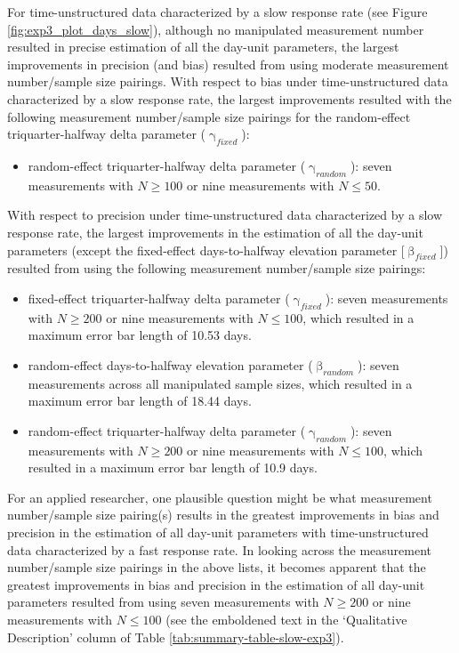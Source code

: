 \documentclass[
12pt, %
twoside,
english]{guelphthesis}
\begin{document}
For time-unstructured data characterized by a slow response rate (see Figure \ref{fig:exp3_plot_days_slow}), although no manipulated measurement number resulted in precise estimation of all the day-unit parameters, the largest improvements in precision (and bias) resulted from using moderate measurement number/sample size pairings. With respect to bias under time-unstructured data characterized by a slow response rate, the largest improvements resulted with the following measurement number/sample size pairings for the random-effect triquarter-halfway delta parameter (\(\upgamma_{fixed}\)):
\begin{itemize}
\tightlist
\item
  random-effect triquarter-halfway delta parameter (\(\upgamma_{random}\)): seven measurements with \(N \ge 100\) or nine measurements with \(N \le 50\).
\end{itemize}
\noindent With respect to precision under time-unstructured data characterized by a slow response rate, the largest improvements in the estimation of all the day-unit parameters (except the fixed-effect days-to-halfway elevation parameter {[}\(\upbeta_{fixed}\){]}) resulted from using the following measurement number/sample size pairings:
\begin{itemize}
\tightlist
\item
  fixed-effect triquarter-halfway delta parameter (\(\upgamma_{fixed}\)): seven measurements with \(N \ge 200\) or nine measurements with \(N \le 100\), which resulted in a maximum error bar length of 10.53 days.
\item
  random-effect days-to-halfway elevation parameter (\(\upbeta_{random}\)): seven measurements across all manipulated sample sizes, which resulted in a maximum error bar length of 18.44 days.
\item
  random-effect triquarter-halfway delta parameter (\(\upgamma_{random}\)): seven measurements with \(N \ge 200\) or nine measurements with \(N \le 100\), which resulted in a maximum error bar length of 10.9 days.
\end{itemize}
For an applied researcher, one plausible question might be what measurement number/sample size pairing(s) results in the greatest improvements in bias and precision in the estimation of all day-unit parameters with time-unstructured data characterized by a fast response rate. In looking across the measurement number/sample size pairings in the above lists, it becomes apparent that the greatest improvements in bias and precision in the estimation of all day-unit parameters resulted from using seven measurements with \(N \ge 200\) or nine measurements with \(N \le 100\) (see the emboldened text in the `Qualitative Description' column of Table \ref{tab:summary-table-slow-exp3}).
\end{document}
